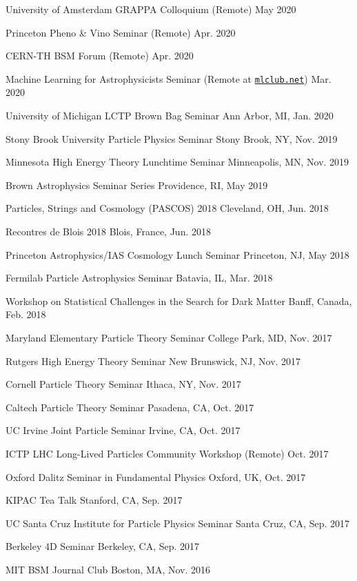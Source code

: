 \documentclass[letterpaper,11pt]{article}
\newenvironment{packed_itemize}{
\begin{itemize}[label=\raisebox{0.25ex}{\tiny$\bullet$}]
  \setlength{\itemsep}{4.2pt}
  \setlength{\parskip}{0pt}
  \setlength{\parsep}{0pt}}{\end{itemize}
}
\begin{document}
\begin{packed_itemize}
  \item University of Amsterdam GRAPPA Colloquium (Remote) \hfill May 2020
  \item Princeton Pheno \& Vino Seminar (Remote) \hfill Apr. 2020
  \item CERN-TH BSM Forum (Remote) \hfill  Apr. 2020
  \item Machine Learning for Astrophysicists Seminar (Remote at \href{https://docs.google.com/document/d/1GGtE-YIuAWlmpKSr38_kyiF-Fklszhkh4FkiYWzBAho/pub}{\texttt{mlclub.net}}) \hfill  Mar. 2020
  \item University of Michigan LCTP Brown Bag Seminar \hfill Ann Arbor, MI, Jan. 2020
  \item Stony Brook University Particle Physics Seminar \hfill Stony Brook, NY, Nov. 2019
  \item Minnesota High Energy Theory Lunchtime Seminar \hfill  Minneapolis, MN, Nov. 2019
  \item Brown Astrophysics Seminar Series \hfill Providence, RI, May 2019
  \item Particles, Strings and Cosmology (PASCOS) 2018 \hfill Cleveland, OH, Jun. 2018
  \item Recontres de Blois 2018 \hfill Blois, France, Jun. 2018
  \item Princeton Astrophysics/IAS Cosmology Lunch Seminar \hfill Princeton, NJ, May 2018
  \item Fermilab Particle Astrophysics Seminar \hfill Batavia, IL, Mar. 2018
  \item Workshop on Statistical Challenges in the Search for Dark Matter \hfill Banff, Canada, Feb. 2018
  \item Maryland Elementary Particle Theory Seminar \hfill College Park, MD, Nov. 2017
  \item Rutgers High Energy Theory Seminar \hfill New Brunswick, NJ, Nov. 2017
  \item Cornell Particle Theory Seminar \hfill Ithaca, NY, Nov. 2017
  \item Caltech Particle Theory Seminar \hfill Pasadena, CA, Oct. 2017
  \item UC Irvine Joint Particle Seminar \hfill Irvine, CA, Oct. 2017
  \item ICTP LHC Long-Lived Particles Community Workshop (Remote) \hfill Oct. 2017
  \item Oxford Dalitz Seminar in Fundamental Physics  \hfill Oxford, UK, Oct. 2017
  \item KIPAC Tea Talk  \hfill Stanford, CA, Sep. 2017
  \item UC Santa Cruz Institute for Particle Physics Seminar  \hfill Santa Cruz, CA, Sep. 2017
  \item Berkeley 4D Seminar  \hfill Berkeley, CA, Sep. 2017
  \item MIT BSM Journal Club \hfill Boston, MA, Nov. 2016
\end{packed_itemize}
\end{document}
